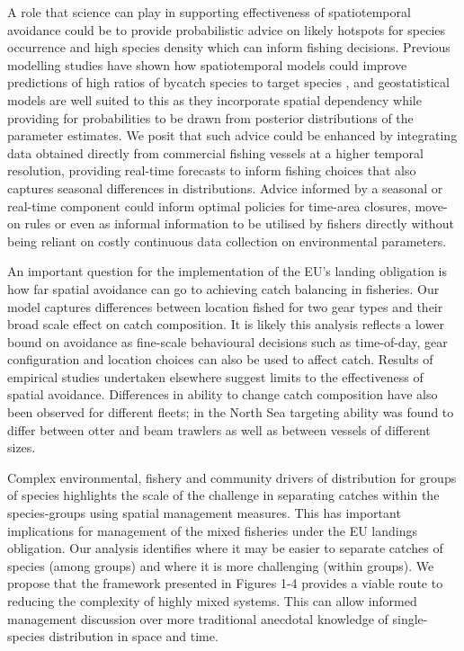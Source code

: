 \documentclass{nature}
\begin{document}
\begin{linenumbers}
A role that science can play in supporting effectiveness of spatiotemporal
avoidance could be to provide probabilistic advice on likely hotspots for
species occurrence and high species density which can inform fishing decisions.
Previous modelling studies have shown how spatiotemporal models could improve
predictions of high ratios of bycatch species to target species \cite{Ward2015,
	Cosandey-Godin2015, Breivik2016}, and geostatistical models are well
suited to this as they incorporate spatial dependency while providing for
probabilities to be drawn from posterior distributions of the parameter
estimates.  We posit that such advice could be enhanced by integrating data
obtained directly from commercial fishing vessels at a higher temporal
resolution, providing real-time forecasts to inform fishing choices that also
captures seasonal differences in distributions.  Advice informed by  a
seasonal or real-time component could inform optimal policies for time-area
closures, move-on rules or even as informal information to be utilised by
fishers directly without being reliant on costly continuous data collection on
environmental parameters.

An important question for the implementation of the EU's landing obligation is
how far spatial avoidance can go to achieving catch balancing in fisheries.
Our model captures differences between location fished for two gear types and
their broad scale effect on catch composition.  It is
likely this analysis reflects a lower bound on  avoidance as fine-scale behavioural decisions such as
time-of-day, gear configuration and location choices can also be used to affect
catch\cite{Abbott2015, Thorson2016}. Results of empirical studies undertaken
elsewhere\cite{Branch2008, Kuriyama2016} suggest limits to the effectiveness of
spatial avoidance. Differences in ability to change catch composition have also
been observed for different fleets; in the North Sea targeting ability was
found to differ between otter and beam trawlers as well as between vessels of
different sizes\cite{Pascoe2007}.  




Complex environmental, fishery and community drivers of distribution for groups
of species highlights the scale of the challenge in separating catches within
the species-groups using spatial management measures. This has important
implications for management of the mixed fisheries under the EU landings
obligation. Our analysis identifies where it may be easier to separate catches
of species (among groups) and where it is more challenging (within groups). We
propose that the framework presented in Figures 1-4 provides a viable route to
reducing the complexity of highly mixed systems.  This can allow informed
management discussion over more traditional anecdotal knowledge of
single-species distribution in space and time.



\end{linenumbers}
\end{document}
